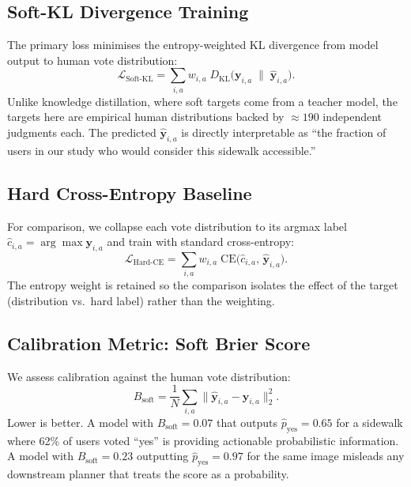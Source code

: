 \documentclass[conference]{IEEEtran}
\newcommand{\brier}{B_{\mathrm{soft}}}
\newcommand{\kl}{D_{\mathrm{KL}}}
\begin{document}
\subsection{Soft-KL Divergence Training}

The primary loss minimises the entropy-weighted KL divergence from model output to human vote distribution:
\begin{equation}
\mathcal{L}_{\mathrm{Soft\text{-}KL}} = \sum_{i,a} w_{i,a}\;\kl\!\bigl(\mathbf{y}_{i,a} \;\|\; \hat{\mathbf{y}}_{i,a}\bigr).
\label{eq:softkl}
\end{equation}
Unlike knowledge distillation, where soft targets come from a teacher model, the targets here are empirical human distributions backed by $\approx 190$ independent judgments each. The predicted $\hat{\mathbf{y}}_{i,a}$ is directly interpretable as ``the fraction of users in our study who would consider this sidewalk accessible.''

\subsection{Hard Cross-Entropy Baseline}

For comparison, we collapse each vote distribution to its argmax label $\hat{c}_{i,a} = \arg\max \mathbf{y}_{i,a}$ and train with standard cross-entropy:
\begin{equation}
\mathcal{L}_{\mathrm{Hard\text{-}CE}} = \sum_{i,a} w_{i,a}\;\mathrm{CE}\!\bigl(\hat{c}_{i,a},\,\hat{\mathbf{y}}_{i,a}\bigr).
\end{equation}
The entropy weight is retained so the comparison isolates the effect of the target (distribution vs.\ hard label) rather than the weighting.

\subsection{Calibration Metric: Soft Brier Score}

We assess calibration against the human vote distribution:
\begin{equation}
\brier = \frac{1}{N}\sum_{i,a} \bigl\|\hat{\mathbf{y}}_{i,a} - \mathbf{y}_{i,a}\bigr\|_2^2.
\label{eq:brier}
\end{equation}
Lower is better. A model with $\brier = 0.07$ that outputs $\hat{p}_\mathrm{yes} = 0.65$ for a sidewalk where 62\% of users voted ``yes'' is providing actionable probabilistic information. A model with $\brier = 0.23$ outputting $\hat{p}_\mathrm{yes} = 0.97$ for the same image misleads any downstream planner that treats the score as a probability.
\end{document}
